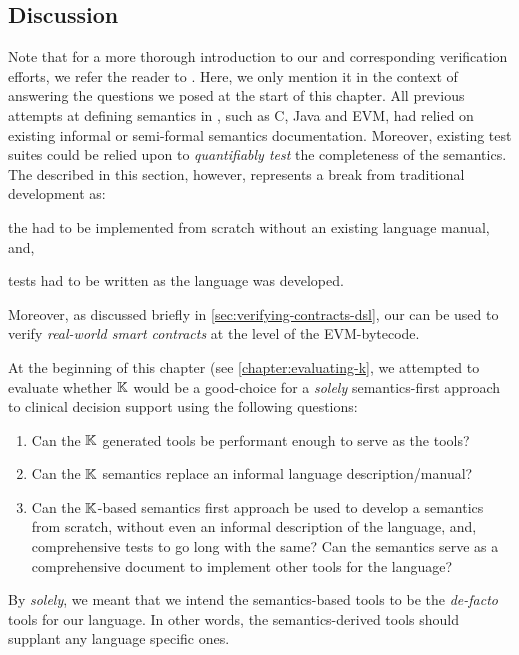 \subsection{Discussion}
Note that for a more thorough introduction to our \DSL{} and corresponding
verification efforts, we refer the reader to \cite{HildenbrandtCSF18,ParkFSE18}.
Here, we only mention it in the context of answering
the questions we posed at the start of this chapter. All previous
attempts at defining semantics in \K{}, such as C, Java and EVM,
had relied on existing informal or semi-formal semantics documentation.
Moreover, existing test suites could be relied upon to \emph{quantifiably test}
the completeness of the semantics. The \DSL{} described in this section,
however, represents a break from traditional \K{} development as:
\begin{enumerate*}[label=(\alph*)]
  \item the \DSL{} had to be implemented from scratch without an existing
     language manual, and,
   \item tests had to be written as the language was developed.
\end{enumerate*}
Moreover, as discussed briefly in \ref{sec:verifying-contracts-dsl},
our \DSL{} can be used to verify \emph{real-world smart contracts} at the
level of the EVM-bytecode.

At the beginning of this chapter (see \autoref{chapter:evaluating-k},
we attempted to evaluate whether $\mathbb{K}$ would be a good-choice for
a \emph{solely} semantics-first approach to clinical decision support using the following
questions:
\begin{enumerate}[label=(Q\arabic*)]
 \item Can the $\mathbb{K}$ generated tools be performant enough to serve as
 the  tools?
 \item Can the $\mathbb{K}$ semantics replace an informal language description/manual?
 \item Can the $\mathbb{K}$-based semantics first approach be used to develop
 a semantics from scratch, without even an informal description of the language,
  and, comprehensive tests to go long with the same? Can the semantics
  serve as a comprehensive document to implement other tools for the language?
\end{enumerate}
By \emph{solely}, we meant that we intend the semantics-based tools to be
the \emph{de-facto} tools for our language. In other words, the
semantics-derived tools should supplant any language specific ones.

